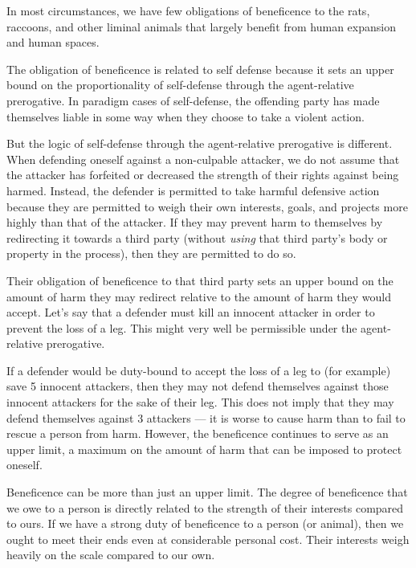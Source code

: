 \documentclass[12pt]{book}
\begin{document}
		In most circumstances, we have few obligations of beneficence to the
		rats, raccoons, and other liminal animals that largely benefit from
		human expansion and human spaces.

		The obligation of beneficence is related to self defense because it sets
		an upper bound on the proportionality of self-defense through the
		agent-relative prerogative. In paradigm cases of self-defense, the
		offending party has made themselves liable in some way when they choose
		to take a violent action.

		But the logic of self-defense through the agent-relative prerogative is
		different. When defending oneself against a non-culpable attacker, we do
		not assume that the attacker has forfeited or decreased the strength
		of their rights against being harmed. Instead, the defender is
		permitted to take harmful defensive action because they are permitted
		to weigh their own interests, goals, and projects more highly than that
		of the attacker. If they may prevent harm to themselves by redirecting
		it towards a third party (without \emph{using} that third party’s body
		or property in the process), then they are permitted to do so.

		Their obligation of beneficence to that third party sets an upper bound
		on the amount of harm they may redirect relative to the amount of harm
		they would accept. Let’s say that a defender must kill an innocent
		attacker in order to prevent the loss of a leg. This might very well
		be permissible under the agent-relative prerogative.

		If a defender would be duty-bound to accept the loss of a leg to (for
		example) save 5 innocent attackers, then they may not defend themselves
		against those innocent attackers for the sake of their leg. This does
		not imply that they may defend themselves against 3 attackers --- it is
		worse to cause harm than to fail to rescue a person from harm. However,
		the beneficence continues to serve as an upper limit, a maximum on the
		amount of harm that can be imposed to protect oneself.

		Beneficence can be more than just an upper limit. The degree of
		beneficence that we owe to a person is directly related to the strength
		of their interests compared to ours. If we have a strong duty of
		beneficence to a person (or animal), then we ought to meet their ends
		even at considerable personal cost. Their interests weigh heavily on
		the scale compared to our own. 
\end{document}
